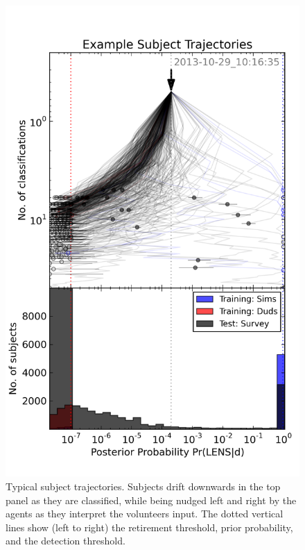 \documentclass[useAMS,usenatbib,a4paper]{mn2e}
\begin{document}
\begin{figure}
\centering\includegraphics[width=0.9\linewidth]{sw-system-figs/CFHTLS_2013-10-29_10:16:35_trajectories.png}
\caption{Typical \SW \StageOne subject trajectories. Subjects drift downwards in
the top panel as they are classified, while being nudged left and right by the
agents as they interpret the volunteers input. The dotted vertical lines show
(left to right) the retirement threshold, prior probability, and the detection
threshold.}
\label{fig:swap:subject-trajectories}
\end{figure}
\end{document}
